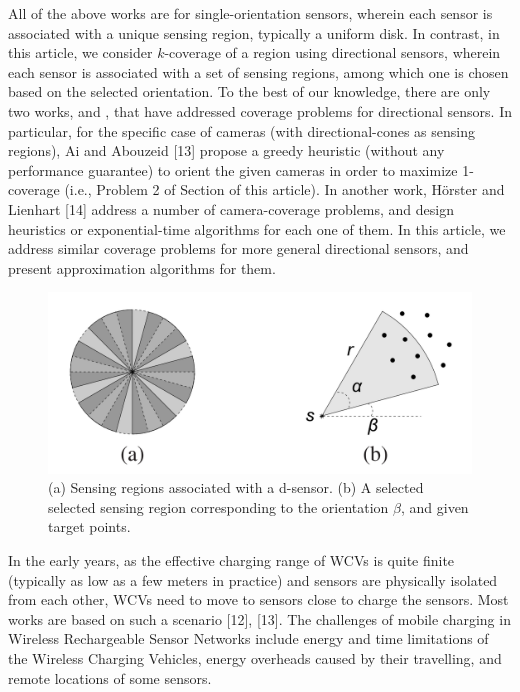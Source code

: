 \documentclass[conference]{IEEEtran}
\theoremstyle{definition}
\newtheorem*{NP-Hardness of Approximating the SODkC Problem}{NP-Hardness of Approximating the SODkC Problem}
\newtheorem*{Greedy Algorithm (GA)}{Greedy Algorithm (GA)}
\newtheorem*{GA on the Running Example}{GA on the Running Example}
\newtheorem*{Performance Guarantee of GA}{Performance Guarantee of GA}
\begin{document}
All of the above works are for single-orientation sensors, wherein each sensor is associated with a unique sensing region, typically a uniform disk. In contrast, in this article, we consider $k$-coverage of a region using directional sensors, wherein each sensor is associated with a set of sensing regions, among which one is chosen based on the selected orientation. To the best of our knowledge, there are only two works, \cite{article} and \cite{10.1145/1178782.1178800}, that have addressed coverage problems for directional sensors. In particular, for the specific case of cameras (with directional-cones as sensing regions), Ai
and Abouzeid [13] propose a greedy heuristic (without any performance guarantee) to orient the given cameras in order to maximize 1-coverage (i.e., Problem 2 of Section \uppercase\expandafter{} of this article). In another work, H\"orster and Lienhart [14] address a number of camera-coverage problems, and design heuristics or exponential-time algorithms for each one of them. In this article, we address similar coverage problems for more general directional sensors, and present approximation algorithms for them.


\begin{figure}[t]
    \centering
    \includegraphics[width=0.8\columnwidth]{1.png}
    \caption{(a) Sensing regions associated with a d-sensor. (b) A selected selected sensing region corresponding to the orientation $\beta$, and given target points.}
    \label{fig:enter-label}
\end{figure}

In the early years, as the effective charging range of WCVs is quite finite (typically as low as a few meters in practice) and sensors are physically isolated from each other, WCVs need to move to sensors close to charge the sensors. Most works are based on such a scenario [12], [13]. The challenges of mobile charging in Wireless Rechargeable Sensor Networks include energy and time limitations of the Wireless Charging Vehicles, energy overheads caused by their travelling, and remote locations of some sensors.
\end{document}
